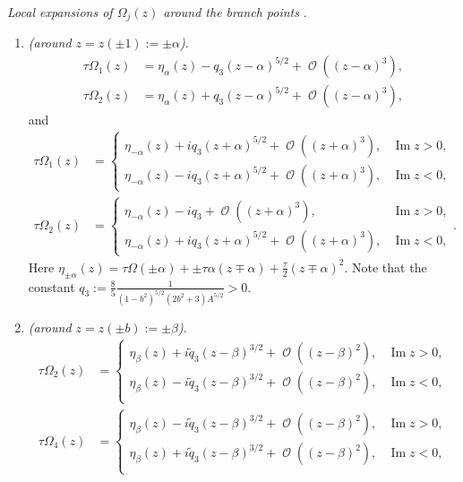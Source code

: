 \documentclass[pdftex]{sigma}
\DeclareMathOperator{\OO}{\mathcal{O}}
\numberwithin{equation}{section}
\begin{document}
\begin{prop}\label{local-expansions-high-temp}
\textit{ Local expansions of $\Omega_j(z)$ around the branch points }.
 \begin{enumerate}\itemsep=0pt
 \item \textit{(around $z= z(\pm 1) := \pm\alpha$)}.
 \begin{align}
 \tau\Omega_1(z) &= \eta_\alpha(z) - q_3 (z-\alpha)^{5/2} +\OO( (z-\alpha)^{3} ),\\
 \tau\Omega_2(z) &= \eta_\alpha(z) + q_3 (z-\alpha)^{5/2} +\OO( (z-\alpha)^{3} ),
 \end{align}
 and
 \begin{align}
 \tau\Omega_1(z) &= \begin{cases}
 \eta_{-\alpha}(z) + iq_3 (z+\alpha)^{5/2} +\OO( (z+\alpha)^{3} ), & \operatorname{Im} z >0,\\
 \eta_{-\alpha}(z) - i q_3 (z+\alpha)^{5/2} +\OO( (z+\alpha)^{3} ), & \operatorname{Im} z <0,
 \end{cases} \\
 \tau\Omega_2(z) &=
 \begin{cases}
 \eta_{-\alpha}(z) - i q_3 +\OO( (z+\alpha)^{3} ), & \operatorname{Im} z >0,\\
 \eta_{-\alpha}(z) + i q_3 (z+\alpha)^{5/2} +\OO( (z+\alpha)^{3} ), & \operatorname{Im} z <0,
 \end{cases} .
 \end{align}
 Here $\eta_{\pm \alpha}(z) = \tau \Omega(\pm \alpha) + \pm\tau \alpha (z\mp\alpha) + \frac{\tau}{2}(z\mp \alpha)^2$. Note that the constant
 $q_3 := \frac{8}{5}\frac{1}{(1-b^2)^{5/2}(2b^2+3)A^{5/2}} >0$.
 \item \textit{(around $z= z( \pm b) := \pm \beta$)}.
 \begin{align}
 \tau\Omega_2(z) &=
 \begin{cases}
 \eta_{\beta}(z) + i\tilde{q}_3 (z -\beta)^{3/2} + \OO( (z-\beta)^2 ), & \operatorname{Im} z > 0,\\
 \eta_{\beta}(z) - i\tilde{q}_3 (z -\beta)^{3/2} + \OO( (z-\beta)^2 ),& \operatorname{Im} z < 0,\\
 \end{cases}\\
 \tau\Omega_4(z) &=
 \begin{cases}
 \eta_{\beta}(z) - i\tilde{q}_3 (z -\beta)^{3/2} + \OO( (z-\beta)^2 ), & \operatorname{Im} z > 0,\\
 \eta_{\beta}(z) + i\tilde{q}_3 (z -\beta)^{3/2} + \OO( (z-\beta)^2 ),& \operatorname{Im} z < 0,\\

\end{cases}
\end{align}
\end{enumerate}
\end{prop}
\end{document}
